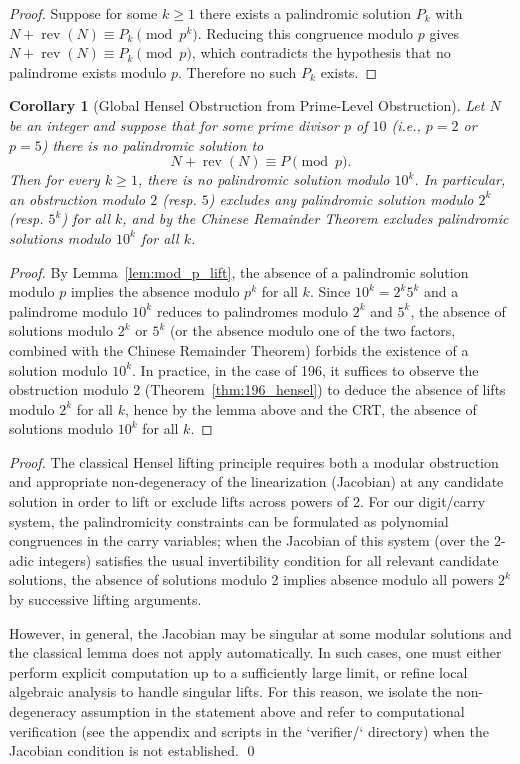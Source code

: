 \documentclass[12pt,a4paper]{article}
\newtheorem{corollary}[theorem]{Corollary}
\begin{document}
\begin{proof}
Suppose for some $k\ge1$ there exists a palindromic solution $P_k$ with
$N+\operatorname{rev}(N)\equiv P_k\pmod{p^k}$. Reducing this congruence modulo $p$ gives
$N+\operatorname{rev}(N)\equiv P_k\pmod p$, which contradicts the hypothesis that no palindrome exists modulo $p$. Therefore no such $P_k$ exists.
\end{proof}

\begin{corollary}[Global Hensel Obstruction from Prime-Level Obstruction]\label{cor:prime_to_power-10}
Let $N$ be an integer and suppose that for some prime divisor $p$ of $10$ (i.e., $p=2$ or $p=5$) there is no palindromic solution to
\[
N + \operatorname{rev}(N) \equiv P \pmod p.
\]
Then for every $k \ge 1$, there is no palindromic solution modulo $10^k$. In particular, an obstruction modulo $2$ (resp. $5$) excludes any palindromic solution modulo $2^k$ (resp. $5^k$) for all $k$, and by the Chinese Remainder Theorem excludes palindromic solutions modulo $10^k$ for all $k$.
\end{corollary}

\begin{proof}
By Lemma~\ref{lem:mod_p_lift}, the absence of a palindromic solution modulo $p$ implies the absence modulo $p^k$ for all $k$. Since $10^k = 2^k 5^k$ and a palindrome modulo $10^k$ reduces to palindromes modulo $2^k$ and $5^k$, the absence of solutions modulo $2^k$ or $5^k$ (or the absence modulo one of the two factors, combined with the Chinese Remainder Theorem) forbids the existence of a solution modulo $10^k$. In practice, in the case of 196, it suffices to observe the obstruction modulo 2 (Theorem~\ref{thm:196_hensel}) to deduce the absence of lifts modulo $2^k$ for all $k$, hence by the lemma above and the CRT, the absence of solutions modulo $10^k$ for all $k$.
\end{proof}

\begin{proof}
The classical Hensel lifting principle requires both a modular obstruction and appropriate non-degeneracy of the linearization (Jacobian) at any candidate solution in order to lift or exclude lifts across powers of 2. For our digit/carry system, the palindromicity constraints can be formulated as polynomial congruences in the carry variables; when the Jacobian of this system (over the 2-adic integers) satisfies the usual invertibility condition for all relevant candidate solutions, the absence of solutions modulo 2 implies absence modulo all powers $2^k$ by successive lifting arguments.

However, in general, the Jacobian may be singular at some modular solutions and the classical lemma does not apply automatically. In such cases, one must either perform explicit computation up to a sufficiently large limit, or refine local algebraic analysis to handle singular lifts. For this reason, we isolate the non-degeneracy assumption in the statement above and refer to computational verification (see the appendix and scripts in the `verifier/` directory) when the Jacobian condition is not established.
\qed
\end{proof}
\end{document}
